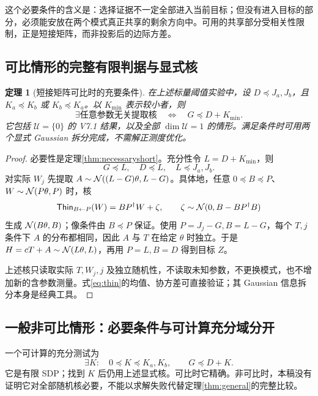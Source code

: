 \documentclass[UTF8,fontset=fandol,11pt,a4paper]{ctexart}
\newtheorem{theorem}{定理}[section]\newtheorem{lemma}[theorem]{引理}
\theoremstyle{definition}\newtheorem{definition}[theorem]{定义}\newtheorem{assumption}[theorem]{条件}
\numberwithin{equation}{section}
\begin{document}
这个必要条件的含义是：选择证据不一定全部进入当前目标；但没有进入目标的部分，必须能安放在两个模式真正共享的剩余方向中。可用的共享部分受相关性限制，正是短接矩阵，而非投影后的边际方差。

\subsection{可比情形的完整有限判据与显式核}
\begin{theorem}[短接矩阵可比时的充要条件]
\label{thm:comparable}
在上述标量阈值实验中，设 $D\preceq J_a,J_b$，且 $K_a\preceq K_b$ 或 $K_b\preceq K_a$。以 $K_{\min}$ 表示较小者，则
\begin{equation}
\boxed{\exists\text{任意参数无关提取核}
\quad\Longleftrightarrow\quad G\preceq D+K_{\min}.}
\label{eq:completefinite}
\end{equation}
它包括 $\mathcal U=\{0\}$ 的 V7.1 结果，以及全部 $\dim\mathcal U=1$ 的情形。满足条件时可用两个显式 Gaussian 拆分完成，不需解正测度优化。
\end{theorem}
\begin{proof}
必要性是定理\ref{thm:necessaryshort}。充分性令 $L=D+K_{\min}$，则
\[
G\preceq L,\quad D\preceq L,\quad L\preceq J_a,J_b.
\]
对实际 $W_j$ 先提取 $A\sim\mathcal N((L-G)\theta,L-G)$。具体地，任意 $0\preceq B\preceq P$、$W\sim\mathcal N(P\theta,P)$ 时，核
\begin{equation}
\mathsf{Thin}_{B\leftarrow P}(W)
=BP^\dagger W+\zeta,
\qquad\zeta\sim\mathcal N(0,B-BP^\dagger B)
\label{eq:thin}
\end{equation}
生成 $\mathcal N(B\theta,B)$；像条件由 $B\preceq P$ 保证。使用 $P=J_j-G,B=L-G$，每个 $T,j$ 条件下 $A$ 的分布都相同，因此 $A$ 与 $T$ 在给定 $\theta$ 时独立。于是 $H=cT+A\sim\mathcal N(L\theta,L)$，再用 $P=L,B=D$ 得到目标 $Z$。

上述核只读取实际 $T,W_j,j$ 及独立随机性，不读取未知参数，不更换模式，也不增加新的含参数测量。式\eqref{eq:thin}的均值、协方差可直接验证；其 Gaussian 信息拆分本身是经典工具\cite{xiao,thinning}。
\end{proof}

\subsection{一般非可比情形：必要条件与可计算充分域分开}
一个可计算的充分测试为
\begin{equation}
\exists K:\quad0\preceq K\preceq K_a,K_b,
\qquad G\preceq D+K.
\label{eq:innerSDP}
\end{equation}
它是有限 SDP；找到 $K$ 后仍用上述显式核。可比时它精确。非可比时，本稿没有证明它对全部随机核必要，不能以求解失败代替定理\ref{thm:general}的完整比较。
\end{document}
